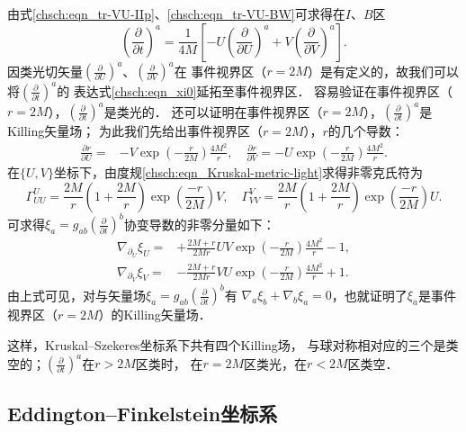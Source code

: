 由式\eqref{chsch:eqn_tr-VU-IIp}、\eqref{chsch:eqn_tr-VU-BW}可求得在$I$、$B$区
\begin{equation}\label{chsch:eqn_xi0}
    \left(\frac{\partial }{\partial t}\right)^a=
    \frac{ 1}{4 M } \left[-U \left(\frac{\partial }{\partial U}\right)^a
    +V \left(\frac{\partial }{\partial V}\right)^a \right] .
\end{equation}
因类光切矢量$(\frac{\partial }{\partial U})^a$、$(\frac{\partial }{\partial V})^a$在
事件视界区（$r=2M$）是有定义的，故我们可以将$(\frac{\partial }{\partial t})^a$的
表达式\eqref{chsch:eqn_xi0}延拓至事件视界区．
容易验证在事件视界区（$r=2M$），$(\frac{\partial }{\partial t})^a$是类光的．
还可以证明在事件视界区（$r=2M$），$(\frac{\partial }{\partial t})^a$是Killing矢量场；
为此我们先给出事件视界区（$r=2M$），$r$的几个导数：
\begin{align}
    \frac{\partial r}{\partial U}=& -V \exp\left(-\frac{r}{2M}\right) \frac{4M^2}{r},\quad
    \frac{\partial r}{\partial V}=  -U \exp\left(-\frac{r}{2M}\right) \frac{4M^2}{r}. %
\end{align}
在$\{U,V\}$坐标下，由度规\eqref{chsch:eqn_Kruskal-metric-light}求得非零克氏符为
\begin{equation*}
    \Gamma^U_{UU} = \frac{2M}{r}\left(1+\frac{2M}{r}\right) \exp\left(\frac{-r}{2M}\right) V,\quad
    \Gamma^V_{VV} = \frac{2M}{r}\left(1+\frac{2M}{r}\right) \exp\left(\frac{-r}{2M}\right) U.
\end{equation*}
可求得$\xi_a=g_{ab}(\frac{\partial }{\partial t})^b$协变导数的非零分量如下：
\begin{align*}
    \nabla_{\partial_U}\xi_U =& +\frac{2 M + r}{2 M r} UV \exp\left(-\frac{r}{2M}\right) \frac{4M^2}{r} -1 ,\\
    \nabla_{\partial_V}\xi_V =& -\frac{2 M + r}{2 M r} VU \exp\left(-\frac{r}{2M}\right) \frac{4M^2}{r} +1 .
\end{align*}
由上式可见，对与矢量场$\xi_a=g_{ab}(\frac{\partial }{\partial t})^b$有
$\nabla_a \xi_b+\nabla_b \xi_a=0$，也就证明了$\xi_a$是事件视界区（$r=2M$）的Killing矢量场．

这样，Kruskal--Szekeres坐标系下共有四个Killing场，
与球对称相对应的三个是类空的；$(\frac{\partial }{\partial t})^a$在$r>2M$区类时，
在$r=2M$区类光，在$r<2M$区类空．


\subsection{Eddington--Finkelstein坐标系}

